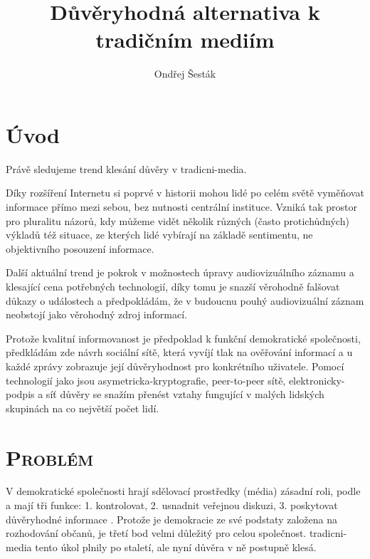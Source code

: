 \documentclass[12pt,a4paper]{report}
\begin{document}
\title{Důvěryhodná alternativa k tradičním mediím}
\author{Ondřej Šesták}

\tableofcontents

\chapter{Úvod}
\label{ch:uvod}

Právě sledujeme trend klesání důvěry v \gls{tradicni-media}.

Díky rozšíření Internetu si poprvé v historii mohou lidé po celém světě vyměňovat informace přímo mezi sebou, bez nutnosti centrální instituce. Vzniká tak prostor pro pluralitu názorů, kdy můžeme vidět několik různých (často protichůdných) výkladů též situace, ze kterých lidé vybírají na základě sentimentu, ne objektivního posouzení informace.

Další aktuální trend je pokrok v možnostech úpravy audiovizuálního záznamu a klesající cena potřebných technologií, díky tomu je snazší věrohodně falšovat důkazy o událostech a předpokládám, že v budoucnu pouhý audiovizuální záznam neobstojí jako věrohodný zdroj informací.

Protože kvalitní informovanost je předpoklad k funkční demokratické společnosti, předkládám zde návrh sociální sítě, která vyvíjí tlak na ověřování informací a u každé zprávy zobrazuje její důvěryhodnost pro konkrétního uživatele. Pomocí technologií jako jsou \gls{asymetricka-kryptografie}, \gls{peer-to-peer} sítě, \gls{elektronicky-podpis} a síť důvěry se snažím přenést vztahy fungující v malých lidských skupinách na co největší počet lidí.

\chapter{\textsc{Problém}}
\label{ch:problem}

V demokratické společnosti hrají sdělovací prostředky (média) zásadní roli, podle \citeauthor{netanel01}a mají tři funkce: 1. kontrolovat, 2. usnadnit veřejnou diskuzi, 3. poskytovat důvěryhodné informace \citep{netanel01}. Protože je demokracie ze své podstaty založena na rozhodování občanů, je třetí bod velmi důležitý pro celou společnost. \Gls{tradicni-media} tento úkol plnily po staletí, ale nyní důvěra v ně postupně klesá.
\end{document}
